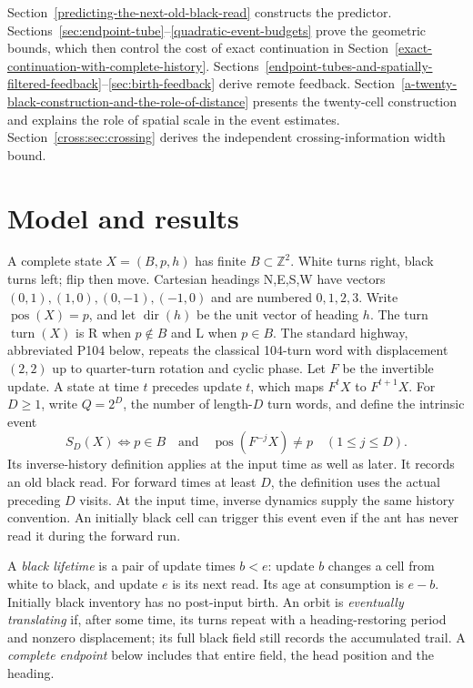 \documentclass[
  11pt,
]{article}
\begin{document}
Section~\ref{predicting-the-next-old-black-read} constructs the predictor.
Sections~\ref{sec:endpoint-tube}--\ref{quadratic-event-budgets} prove the
geometric bounds, which then control the cost of exact continuation in
Section~\ref{exact-continuation-with-complete-history}.
Sections~\ref{endpoint-tubes-and-spatially-filtered-feedback}--\ref{sec:birth-feedback}
derive remote feedback. Section~\ref{a-twenty-black-construction-and-the-role-of-distance}
presents the twenty-cell construction and explains the role of spatial scale in the event estimates.
Section~\ref{cross:sec:crossing} derives the independent crossing-information width bound.

\section{Model and results}\label{model-and-results}

A complete state \(X=(B,p,h)\) has finite \(B\subset\mathbb Z^2\). White
turns right, black turns left; flip then move. Cartesian headings N,E,S,W
have vectors $(0,1),(1,0),(0,-1),(-1,0)$ and are numbered $0,1,2,3$.
Write \(\operatorname{pos}(X)=p\), and let \(\operatorname{dir}(h)\) be the unit
vector of heading \(h\). The turn \(\operatorname{turn}(X)\) is
\(\mathrm R\) when \(p\notin B\) and \(\mathrm L\) when \(p\in B\).
The standard highway, abbreviated P104 below, repeats the classical
104-turn word with displacement $(2,2)$ up to quarter-turn rotation and
cyclic phase. Let \(F\) be the
invertible update. A state at time \(t\) precedes update \(t\), which
maps \(F^tX\) to \(F^{t+1}X\). For \(D\ge1\), write \(Q=2^D\), the number of length-$D$ turn words, and define the
intrinsic event \[S_D(X)\iff p\in B\quad\text{and}\quad
\operatorname{pos}(F^{-j}X)\ne p\quad(1\le j\le D).\] Its
inverse-history definition applies at the input time as well as later.
It records an old black read. For forward times at least $D$, the definition
uses the actual preceding $D$ visits. At the input time, inverse dynamics
supply the same history convention. An initially black cell can trigger this
event even if the ant has never read it during the forward run.

A \emph{black lifetime} is a pair of update times $b<e$: update $b$ changes a
cell from white to black, and update $e$ is its next read. Its age at consumption
is $e-b$. Initially black inventory has no post-input birth. An orbit is
\emph{eventually translating} if, after some time, its turns repeat with a
heading-restoring period and nonzero displacement; its full black field still
records the accumulated trail. A \emph{complete endpoint} below includes that
entire field, the head position and the heading.
\end{document}
